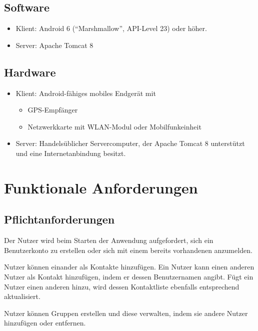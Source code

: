 \documentclass[parskip=full,11pt]{scrartcl}
\begin{document}
\subsection{Software}
\begin{itemize}
    \item Klient: Android 6 (\enquote{Marshmallow}, API-Level 23) oder
        höher.
    \item Server: Apache Tomcat 8
\end{itemize}

\subsection{Hardware}
\begin{itemize}
    \item Klient: Android-fähiges mobiles Endgerät mit
        \begin{itemize}
            \item GPS-Empfänger
            \item Netzwerkkarte mit WLAN-Modul oder Mobilfunkeinheit
        \end{itemize}
    \item Server: Handelsüblicher Servercomputer, der Apache Tomcat 8
        unterstützt und eine Internetanbindung besitzt.
\end{itemize}

\pagebreak
\section{Funktionale Anforderungen}

\subsection{Pflichtanforderungen}

%
Der Nutzer wird beim Starten der Anwendung aufgefordert, sich ein
Benutzerkonto zu erstellen oder sich mit einem bereits vorhandenen anzumelden.

%
%
%
Nutzer können einander als Kontakte hinzufügen.
Ein Nutzer kann einen anderen Nutzer als Kontakt hinzufügen,
indem er dessen Benutzernamen angibt.
Fügt ein Nutzer einen anderen hinzu,
wird dessen Kontaktliste ebenfalls entsprechend aktualisiert.

%
Nutzer können Gruppen erstellen und diese verwalten, indem sie andere Nutzer
hinzufügen oder entfernen.
\end{document}
